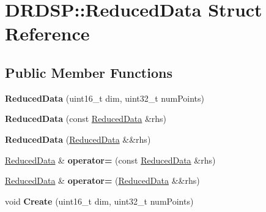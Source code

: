 \hypertarget{struct_d_r_d_s_p_1_1_reduced_data}{\section{D\-R\-D\-S\-P\-:\-:Reduced\-Data Struct Reference}
\label{struct_d_r_d_s_p_1_1_reduced_data}
}
\subsection*{Public Member Functions}
\begin{DoxyCompactItemize}
\item 
\hypertarget{struct_d_r_d_s_p_1_1_reduced_data_aaff26858fe467422cfcb125996759ce9}{{\bfseries Reduced\-Data} (uint16\-\_\-t dim, uint32\-\_\-t num\-Points)}\label{struct_d_r_d_s_p_1_1_reduced_data_aaff26858fe467422cfcb125996759ce9}

\item 
\hypertarget{struct_d_r_d_s_p_1_1_reduced_data_a2260037d761f2dc5154c60b4fcba95b3}{{\bfseries Reduced\-Data} (const \hyperlink{struct_d_r_d_s_p_1_1_reduced_data}{Reduced\-Data} \&rhs)}\label{struct_d_r_d_s_p_1_1_reduced_data_a2260037d761f2dc5154c60b4fcba95b3}

\item 
\hypertarget{struct_d_r_d_s_p_1_1_reduced_data_a746ac3e59554e6299e31f79025f4d5f3}{{\bfseries Reduced\-Data} (\hyperlink{struct_d_r_d_s_p_1_1_reduced_data}{Reduced\-Data} \&\&rhs)}\label{struct_d_r_d_s_p_1_1_reduced_data_a746ac3e59554e6299e31f79025f4d5f3}

\item 
\hypertarget{struct_d_r_d_s_p_1_1_reduced_data_a65c05f12dad9db478dd1aaca4486bf3c}{\hyperlink{struct_d_r_d_s_p_1_1_reduced_data}{Reduced\-Data} \& {\bfseries operator=} (const \hyperlink{struct_d_r_d_s_p_1_1_reduced_data}{Reduced\-Data} \&rhs)}\label{struct_d_r_d_s_p_1_1_reduced_data_a65c05f12dad9db478dd1aaca4486bf3c}

\item 
\hypertarget{struct_d_r_d_s_p_1_1_reduced_data_a74732d52875f87cbbbbdb75bb8d51837}{\hyperlink{struct_d_r_d_s_p_1_1_reduced_data}{Reduced\-Data} \& {\bfseries operator=} (\hyperlink{struct_d_r_d_s_p_1_1_reduced_data}{Reduced\-Data} \&\&rhs)}\label{struct_d_r_d_s_p_1_1_reduced_data_a74732d52875f87cbbbbdb75bb8d51837}

\item 
\hypertarget{struct_d_r_d_s_p_1_1_reduced_data_ac53310fd4248f636f24a2041b2df3285}{void {\bfseries Create} (uint16\-\_\-t dim, uint32\-\_\-t num\-Points)}\label{struct_d_r_d_s_p_1_1_reduced_data_ac53310fd4248f636f24a2041b2df3285}


\end{DoxyCompactItemize}
